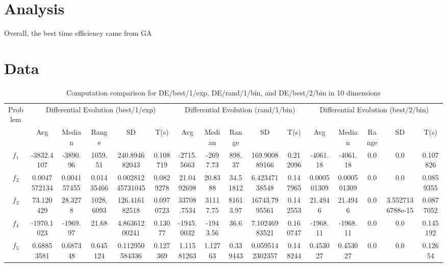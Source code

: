 \documentclass[paper=a4, fontsize=11pt]{scrartcl} %
\numberwithin{equation}{section} %
\numberwithin{figure}{section} %
\numberwithin{table}{section} %
\begin{document}
	\pagebreak
	
\section{Analysis}
Overall, the best time efficiency came from GA

	
\section{Data}



\begin{landscape}
	\begin{table}
		\tiny
		\centering
		\caption{Computation comparison for DE/best/1/exp, DE/rand/1/bin, and DE/best/2/bin in 10 dimensions}
		\label{Tab1d}
		\begin{tabular}{c|ccccc|ccccc|ccccc}
			\noalign{\smallskip}\hline\noalign{\smallskip}
			Problem & \multicolumn{5}{c}{Differential Evolution (best/1/exp)}& \multicolumn{5}{|c|}{Differential Evolution (rand/1/bin)} &  \multicolumn{5}{c}{Differential Evolution (best/2/bin)} \\ 
			\noalign{\smallskip}\hline\noalign{\smallskip}
			& Avg & Median & Range & SD & T(s) & Avg & Median
			& Range & SD & T(s) & Avg & Median & Range & SD &
			T(s) \\ 
			\noalign{\smallskip}\hline\noalign{\smallskip}
			$f_{1}$ & -3832.4107 & -3890.96 & 1059.51 & 240.894682043 & 0.108719 & -2715.5663 & -2697.73 & 898.37 & 169.900889166 & 0.212096 & -4061.18 & -4061.18 & 0.0 & 0.0 & 0.107826\\
			$f_{2}$ & 0.0047572134 & 0.004157455 & 0.01435466 & 0.00281245731045 & 0.0829278 & 21.0492698 & 20.8388 & 34.51812 & 6.42347138548 & 0.147965 & 0.000501309 & 0.000501309 & 0.0 & 0.0 & 0.0859355\\
			$f_{3}$ & 73.120429 & 28.3278 & 1028.6093 & 126.416182518 & 0.0970723 & 33708.7534 & 31117.75 & 81613.97 & 16743.7995561 & 0.142553 & 21.4946 & 21.4946 & 0.0 & 3.5527136788e-15 & 0.0877052\\
			$f_{4}$ & -1970.1023 & -1969.97 & 21.68 & 4.86361200241 & 0.13077 & -1945.0032 & -1943.56 & 36.6 & 7.10246983521 & 0.160747 & -1968.11 & -1968.11 & 0.0 & 0.0 & 0.145192\\
			$f_{5}$ & 0.68853581 & 0.687348 & 0.645124 & 0.112950584336 & 0.127369 & 1.11581263 & 1.12763 & 0.339443 & 0.0595142302357 & 0.148244 & 0.453027 & 0.453027 & 0.0 & 0.0 & 0.12654\\

\end{tabular}
\end{table}
\end{landscape}
\end{document}

